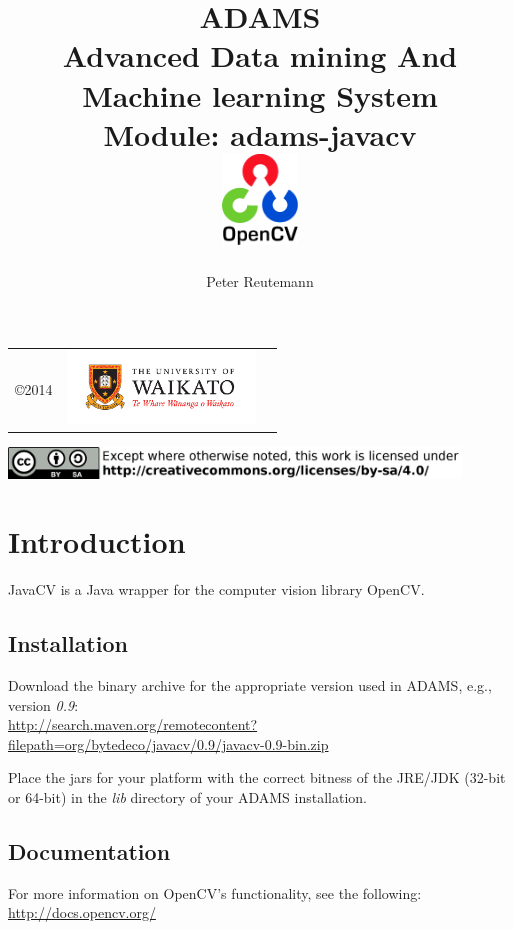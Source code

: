 \documentclass[a4paper]{book}
\title{
  \textbf{ADAMS} \\
  {\Large \textbf{A}dvanced \textbf{D}ata mining \textbf{A}nd \textbf{M}achine
  learning \textbf{S}ystem} \\
  {\Large Module: adams-javacv} \\
  \vspace{1cm}
  \includegraphics[width=2cm]{images/javacv-module.png} \\
}
\author{
  Peter Reutemann
}
\begin{document}
\begin{titlepage}
\maketitle

\thispagestyle{empty}
\center
\begin{table}[b]
	\begin{tabular}{c l l}
		\parbox[c][2cm]{2cm}{\copyright 2014} &
		\parbox[c][2cm]{5cm}{\includegraphics[width=5cm]{images/coat_of_arms.pdf}} \\
	\end{tabular}
	\includegraphics[width=12cm]{images/cc.png} \\
\end{table}

\end{titlepage}

\tableofcontents


\chapter{Introduction}
JavaCV\cite{javacv} is a Java wrapper for the computer vision library 
OpenCV\cite{opencv}.

\section{Installation}
Download the binary archive for the appropriate version used in ADAMS, e.g.,
version \textit{0.9}: \\
\url{http://search.maven.org/remotecontent?filepath=org/bytedeco/javacv/0.9/javacv-0.9-bin.zip}{}

Place the jars for your platform with the correct bitness of the JRE/JDK 
(32-bit or 64-bit) in the \textit{lib} directory of your ADAMS installation.

\section{Documentation}
For more information on OpenCV's functionality, see the following: \\
\url{http://docs.opencv.org/}{}


\end{document}
